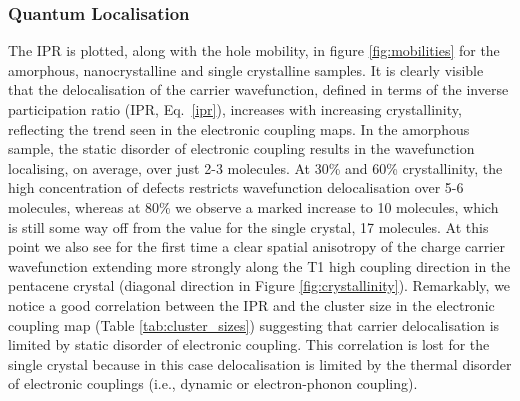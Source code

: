 \subsubsection{Quantum Localisation}
The IPR is plotted, along with the hole mobility, in figure \ref{fig:mobilities} for the amorphous, nanocrystalline and single crystalline samples. It is clearly visible that the delocalisation of the carrier wavefunction, defined in terms of the inverse participation ratio (IPR, Eq.~\ref{ipr}), increases with increasing crystallinity, reflecting the trend seen in the electronic coupling maps. In the amorphous sample, the static disorder of electronic coupling results in the wavefunction localising, on average, over just 2-3 molecules. At 30\% and 60\% crystallinity, the high concentration of defects restricts wavefunction delocalisation over 5-6 molecules, whereas at 80\% we observe a marked increase to 10 molecules, which is still some way off from the value for the single crystal, 17 molecules.  At this point we also see for the first time a clear spatial anisotropy of the charge carrier wavefunction extending more strongly along the T1 high coupling direction in the pentacene crystal (diagonal direction in Figure \ref{fig:crystallinity}). Remarkably, we notice a good correlation between the IPR and the cluster size in the electronic coupling map (Table \ref{tab:cluster_sizes}) suggesting that carrier delocalisation is limited by static disorder of electronic coupling. This correlation is lost for the single crystal because in this case delocalisation is limited by the thermal disorder of electronic couplings (i.e., dynamic or electron-phonon coupling). 
